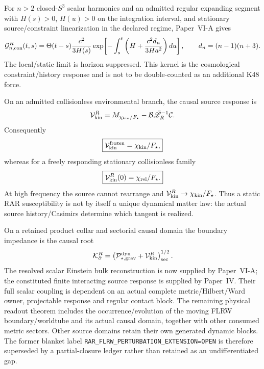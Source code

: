 \documentclass[12pt,a4paper]{article}
\begin{document}
\begin{corollary}
\label{p9:cor:v1107-resolved-cold-readout}
For $n>2$ closed-$S^3$ scalar harmonics and an admitted regular expanding
segment with \(H(s)>0\), \(H(u)>0\) on the integration interval, and
stationary source/constraint linearization in the declared regime,
Paper~VI-A gives
\[
 \mathcal G_{n,\rm con}^{R}(t,s)
 =\Theta(t-s)\frac{c^2}{3H(s)}
 \exp\!\left[-\int_s^t
 \left(H+\frac{c^2d_n}{3Ha^2}\right)du\right],
 \qquad d_n=(n-1)(n+3).
\]
The local/static limit is horizon suppressed.  This kernel is the cosmological
constraint/history response and is not to be double-counted as an additional
K48 force.
\end{corollary}

\begin{corollary}
\label{p9:cor:v1107-kinetic-dynamic-readout}
On an admitted collisionless environmental branch, the causal source response is
\[
 \mathcal V_{\rm kin}^{R}
 =M_{\chi_{\rm kin}/F_\star}
 -\mathcal B\bar{\mathscr L}_R^{-1}\mathcal C.
\]
Consequently
\[
 \boxed{
 \mathcal V_{\rm kin}^{\rm frozen}=\chi_{\rm kin}/F_\star,}
\]
whereas for a freely responding stationary collisionless family
\[
 \boxed{
 \mathcal V_{\rm kin}^{R}(0)=\chi_{\rm rel}/F_\star.}
\]
At high frequency the source cannot rearrange and
$\mathcal V_{\rm kin}^{R}\to\chi_{\rm kin}/F_\star$.  Thus a static RAR
susceptibility is not by itself a unique dynamical matter law: the actual
source history/Casimirs determine which tangent is realized.
\end{corollary}

\begin{remark}
\label{p9:rem:v1107-moving-port-frontier}
On a retained product collar and sectorial causal domain the boundary impedance
is the causal root
\[
 \mathcal K_{\partial}^{R}
 =\left(\mathcal P_{\star,\rm grav}^{\rm dyn}
 +\mathcal V_{\rm kin}^{R}\right)_{\rm sec}^{1/2}.
\]
The resolved scalar Einstein bulk reconstruction is now supplied by
Paper~VI-A; the constituted finite interacting source response is supplied by
Paper~IV.  Their full scalar coupling is dependent on an actual complete
metric/Hilbert/Ward owner, projectable response and regular contact block.
The remaining physical readout theorem includes the occurrence/evolution of
the moving FLRW boundary/worldtube and its actual causal domain, together with
other consumed metric sectors.  Other source domains retain their own
generated dynamic blocks.  The former blanket label
\texttt{RAR\_FLRW\_PERTURBATION\_EXTENSION=OPEN} is therefore superseded by a
partial-closure ledger rather than retained as an undifferentiated gap.
\end{remark}
\end{document}
